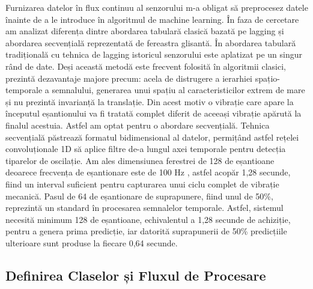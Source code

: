 	Furnizarea datelor în flux continuu al senzorului \cite{esp32_datasheet} m-a obligat să preprocesez datele înainte de a le introduce în algoritmul de machine learning. În faza de cercetare am analizat diferența dintre abordarea tabulară clasică bazată pe lagging și abordarea secvențială reprezentată de fereastra glisantă.
	În abordarea tabulară tradițională cu tehnica de lagging istoricul senzorului este aplatizat pe un singur rând de date.  Deși această metodă este frecvent folosită în algoritmii clasici, prezintă dezavantaje majore precum: acela de distrugere a ierarhiei spațio-temporale a semnalului, generarea unui spațiu al caracteristicilor extrem de mare și nu prezintă invarianță la translație. Din acest motiv o vibrație care apare la începutul eșantionului va fi tratată complet diferit de aceeași vibrație apărută la finalul acestuia.
	Astfel am optat pentru o abordare secvențială. Tehnica secvențială păstrează formatul bidimensional al datelor, permițând astfel rețelei convoluționale 1D să aplice filtre de-a lungul axei temporale pentru detecția tiparelor de oscilație. \cite{invensense:mpu6050_datasheet} Am ales dimensiunea ferestrei de 128 de eșantioane \cite{ince2016real} deoarece frecvența de eșantionare este de 100 Hz \cite{alfarag3embedded}, astfel acopăr 1,28 secunde, fiind un interval suficient pentru capturarea unui ciclu complet de vibrație mecanică. Pasul de 64 de eșantionare de suprapunere, fiind unul de 50\%, reprezintă un standard în procesarea semnalelor temporale. \cite{gupta2025embedded, kolok2025low} Astfel, sistemul necesită minimum 128 de eșantioane, echivalentul a 1,28 secunde de achiziție, pentru a genera prima predicție, iar datorită suprapunerii de 50\% predicțiile ulterioare sunt produse la fiecare 0,64 secunde.
	
\subsection{Definirea Claselor și Fluxul de Procesare}
	
